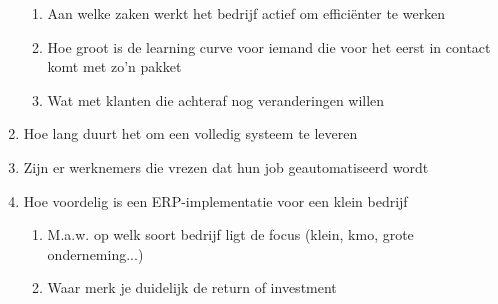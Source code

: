 \begin{enumerate}
    \begin{enumerate}
        \item Aan welke zaken werkt het bedrijf actief om efficiënter te werken
        
        \item Hoe groot is de learning curve voor iemand die voor het eerst in contact komt met zo'n pakket
        
        \item Wat met klanten die achteraf nog veranderingen willen
    \end{enumerate}

    \item Hoe lang duurt het om een volledig systeem te leveren
    
    \item Zijn er werknemers die vrezen dat hun job geautomatiseerd wordt
    
    \item Hoe voordelig is een ERP-implementatie voor een klein bedrijf
    
    \begin{enumerate}
        \item M.a.w. op welk soort bedrijf ligt de focus (klein, kmo, grote onderneming...)
        
        \item Waar merk je duidelijk de return of investment
    \end{enumerate}
\end{enumerate}